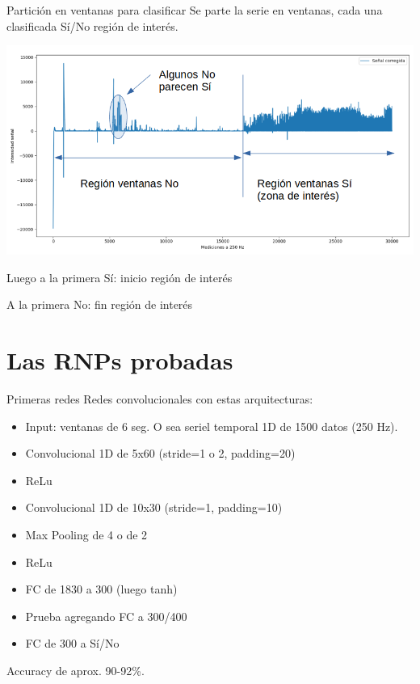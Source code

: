 \documentclass[presentation,9pt]{beamer}
\begin{document}
\begin{frame}{Partición en ventanas para clasificar}
	Se parte la serie en ventanas, cada una clasificada Sí/No región de interés.
	
	\includegraphics[width=\textwidth]{./separacionVentanasBien.png}

	Luego a la primera Sí: inicio región de interés

	A la primera No: fin región de interés
	
\end{frame}




\section{Las RNPs probadas}
\begin{frame}{Primeras redes}
	Redes convolucionales con estas arquitecturas:
	\begin{itemize}
		\item Input: ventanas de 6 seg. O sea seriel temporal 1D de 1500 datos (250 Hz).
		\item Convolucional 1D de 5x60 (stride=1 o 2, padding=20)
		\item ReLu
		\item Convolucional 1D de 10x30 (stride=1, padding=10)
		\item Max Pooling de 4 o de 2
		\item ReLu 
		\item FC de 1830 a 300 (luego tanh)
		\item Prueba agregando FC a 300/400
		\item FC de 300 a Sí/No
	\end{itemize}
	
	Accuracy de aprox. 90-92\%.
	
	
\end{frame}
\end{document}
